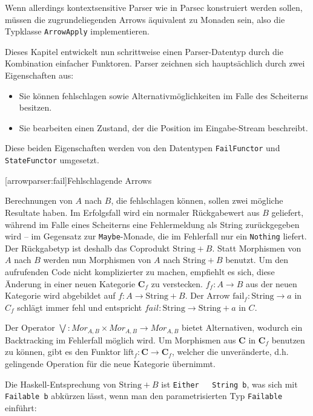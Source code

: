 \documentclass[12pt, a4paper, bibgerm]{scrbook}
\newcommand\icode[1]{\lstinline?#1?}
\newcommand\lsection{}
\newcommand\ato{\rightarrow} %
\begin{document}
Wenn allerdings kontextsensitive Parser wie in Parsec konstruiert werden
sollen, müssen die zugrundeliegenden Arrows äquivalent zu Monaden sein,
also die Typklasse \icode{ArrowApply} implementieren.

Dieses Kapitel entwickelt nun schrittweise einen Parser-Datentyp durch
die Kombination einfacher Funktoren. Parser zeichnen sich hauptsächlich
durch zwei Eigenschaften aus:
\begin{itemize}
\item Sie können fehlschlagen sowie Alternativmöglichkeiten im Falle des
  Scheiterns besitzen.
\item Sie bearbeiten einen Zustand, der die Position im Eingabe-Stream
  beschreibt.
\end{itemize}
Diese beiden Eigenschaften werden von den Datentypen \icode{FailFunctor}
und \icode{StateFunctor} umgesetzt.

\lsection[arrowparser:fail]{Fehlschlagende Arrows}

Berechnungen von $A$ nach $B$, die fehlschlagen können, sollen zwei
mögliche Resultate haben. Im Erfolgsfall wird ein normaler Rückgabewert
aus $B$ geliefert, während im Falle eines Scheiterns eine Fehlermeldung
als String zurückgegeben wird -- im Gegensatz zur \icode{Maybe}-Monade,
die im Fehlerfall nur ein \icode{Nothing} liefert. Der Rückgabetyp ist
deshalb das Coprodukt $\mathrm{String}+B$. Statt Morphismen von $A$ nach
$B$ werden nun Morphismen von $A$ nach $\mathrm{String}+B$ benutzt. Um
den aufrufenden Code nicht komplizierter zu machen, empfiehlt es sich,
diese Änderung in einer neuen Kategorie $\mathbf{C}_f$ zu
verstecken. $f_{f} : A \rightarrow B$ aus der neuen Kategorie wird
abgebildet auf $f : A \rightarrow \mathrm{String} + B$. Der Arrow
$\mathrm{fail}_{f} : \mathrm{String} \rightarrow a$ in $C_{f}$ schlägt
immer fehl und entspricht $fail : \mathrm{String} \rightarrow
\mathrm{String} + a$ in $C$.

Der Operator $\bigvee : Mor_{A,B} \times Mor_{A,B}
\rightarrow Mor_{A,B} $ bietet Alternativen, wodurch ein Backtracking im
Fehlerfall möglich wird. Um Morphismen aus
$\mathbf{C}$ in $\mathbf{C}_f$ benutzen zu können, gibt es den Funktor
$\mathrm{lift}_f:\mathbf{C} \ato \mathbf{C}_f$, welcher die
unveränderte, d.h. gelingende Operation für die neue Kategorie
übernimmt.

Die Haskell-Entsprechung von $\mathrm{String}+B$ ist \icode{Either
  String b}, was sich mit \icode{Failable b} abkürzen lässt, wenn man
den parametrisierten Typ \icode{Failable} einführt:
\end{document}
